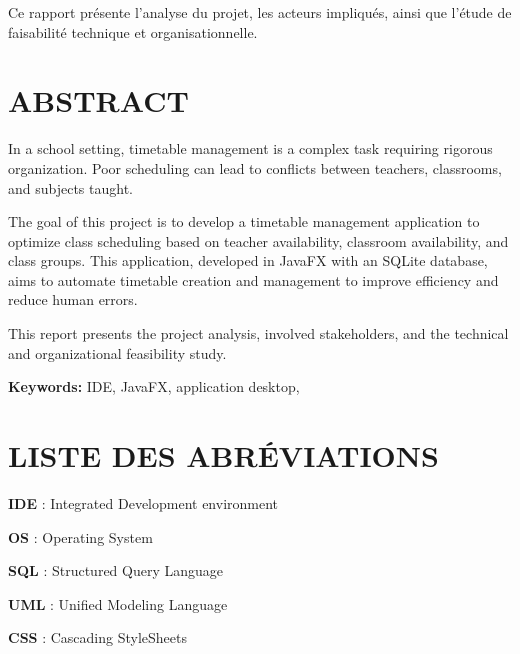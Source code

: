 \documentclass[english,12pt,a4paper]{report}
\begin{document}
\begin{spacing}{1.5}
Ce rapport présente l’analyse du projet, les acteurs impliqués, ainsi que l’étude de faisabilité technique et organisationnelle.
\bigskip 
\bigskip
\par 

\chapter*{ABSTRACT}
\hspace{1.2cm}
In a school setting, timetable management is a complex task requiring rigorous organization. Poor scheduling can lead to conflicts between teachers, classrooms, and subjects taught.

The goal of this project is to develop a timetable management application to optimize class scheduling based on teacher availability, classroom availability, and class groups. This application, developed in JavaFX with an SQLite database, aims to automate timetable creation and management to improve efficiency and reduce human errors.

This report presents the project analysis, involved stakeholders, and the technical and organizational feasibility study.


\bigskip 
\bigskip
\par 

\textbf{Keywords:} IDE, JavaFX, application desktop, 
\chapter*{LISTE DES ABRÉVIATIONS}
\textbf{IDE} : Integrated Development environment 

\textbf{OS} : 	 Operating System 

\textbf{SQL} :  	Structured Query Language

\textbf{UML} : Unified Modeling Language

\textbf{CSS} : Cascading StyleSheets
\end{spacing}

\tableofcontents

\cleardoublepage
{}

\listoffigures

\cleardoublepage
{}

\listoftables
\end{document}
